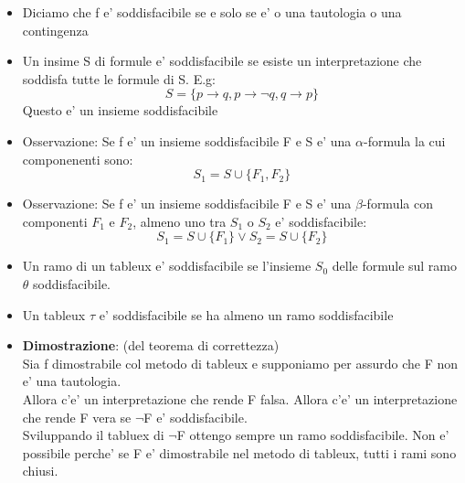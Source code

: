 \documentclass{article}
\begin{document}
    \begin{itemize}
        \item Diciamo che f e' soddisfacibile se e solo se e' o una tautologia o una contingenza
        \item Un insime S di formule e' soddisfacibile se esiste un interpretazione che soddisfa tutte le formule di S. E.g:
            \begin{equation}
                S=\{p\to q,p \to \neg q, q\to p\}
            \end{equation}
            Questo e' un insieme soddisfacibile
        \item Osservazione: Se f e' un insieme soddisfacibile F e S e' una $\alpha$-formula la cui componenenti sono:
            \begin{equation}
                S_1=S\cup \{F_1,F_2\}
            \end{equation}
        \item Osservazione: Se f e' un insieme soddisfacibile F e S e' una $\beta$-formula con componenti $F_1$ e $F_2$,
            almeno uno tra $S_1$ o $S_2$ e' soddisfacibile:
            \begin{equation}
                S_1=S\cup \{F_1\} \lor  S_2=S\cup \{F_2\}
            \end{equation}
        \item Un ramo di un tableux e' soddisfacibile se l'insieme $S_0$ delle formule sul ramo $\theta$ soddisfacibile.
        \item Un tableux $\tau$ e' soddisfacibile se ha almeno un ramo soddisfacibile
        \item    \textbf{Dimostrazione}: (del teorema di correttezza)\\
            Sia f dimostrabile col metodo di tableux e supponiamo per assurdo che F non e' una tautologia. \\
            Allora c'e' un interpretazione che rende F falsa.
            Allora c'e' un interpretazione che rende F vera se $\neg$F e' soddisfacibile.\\
            Sviluppando il tabluex di $\neg$F ottengo sempre un ramo soddisfacibile. Non e' possibile perche' se F e' dimostrabile
            nel metodo di tableux, tutti i rami sono chiusi.
    \end{itemize}
\end{document}
